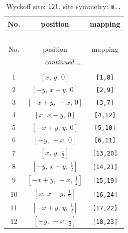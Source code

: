 \documentclass[fleqn,8pt]{jsarticle}
\begin{document}
\begin{longtable}{ccc}
\caption{Wyckoff site: {\tt 12l}, site symmetry: {\tt m..}}
 \\
 \hline \hline
No. & position & mapping \\ \hline \endfirsthead

\multicolumn{2}{l}{\tablename\ \thetable{}} \\
 \hline \hline
No. & position & mapping \\ \hline \endhead

 \hline \hline
\multicolumn{2}{r}{\footnotesize\it continued ...} \\ \endfoot

 \hline \hline
\multicolumn{2}{r}{} \\ \endlastfoot

1 & $\left[ x,\, y,\, 0 \right]$ & {\tt [1,8]} \\ \hline
2 & $\left[ - y,\, x - y,\, 0 \right]$ & {\tt [2,9]} \\ \hline
3 & $\left[ - x + y,\, - x,\, 0 \right]$ & {\tt [3,7]} \\ \hline
4 & $\left[ x,\, x - y,\, 0 \right]$ & {\tt [4,12]} \\ \hline
5 & $\left[ - x + y,\, y,\, 0 \right]$ & {\tt [5,10]} \\ \hline
6 & $\left[ - y,\, - x,\, 0 \right]$ & {\tt [6,11]} \\ \hline
7 & $\left[ x,\, y,\, \frac{1}{2} \right]$ & {\tt [13,20]} \\ \hline
8 & $\left[ - y,\, x - y,\, \frac{1}{2} \right]$ & {\tt [14,21]} \\ \hline
9 & $\left[ - x + y,\, - x,\, \frac{1}{2} \right]$ & {\tt [15,19]} \\ \hline
10 & $\left[ x,\, x - y,\, \frac{1}{2} \right]$ & {\tt [16,24]} \\ \hline
11 & $\left[ - x + y,\, y,\, \frac{1}{2} \right]$ & {\tt [17,22]} \\ \hline
12 & $\left[ - y,\, - x,\, \frac{1}{2} \right]$ & {\tt [18,23]} \\
\end{longtable}
\renewcommand{\arraystretch}{1.2}
\end{document}
